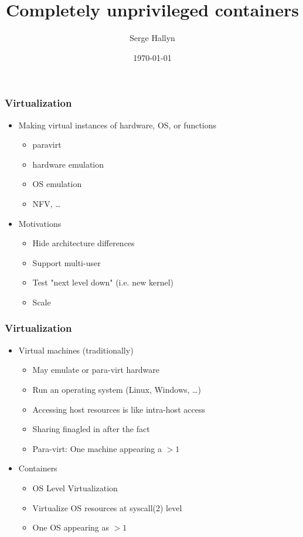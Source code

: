 \documentclass{beamer}
\title[Unprivileged containers]{Completely unprivileged containers} %
\author{Serge Hallyn} %
\institute{LXC project}
\date{\today} %
\begin{document}
\begin{frame}
\titlepage %
\end{frame}

\begin{frame}[fragile]
\frametitle{Virtualization}
	\begin{itemize}
	\item Making virtual instances of hardware, OS, or functions
		\begin{itemize}
		\item paravirt
		\item hardware emulation
		\item OS emulation
		\item NFV, \ldots
		\end{itemize}
\pause
	\item Motivations
		\begin{itemize}
		\item Hide architecture differences
		\item Support multi-user
		\item Test "next level down" (i.e. new kernel)
		\item Scale
		\end{itemize}
	\end{itemize}
\end{frame}

\begin{frame}[fragile]
\frametitle{Virtualization}
	\begin{itemize}
	\item Virtual machines (traditionally)
		\begin{itemize}
		\item May emulate or para-virt hardware
		\item Run an operating system (Linux, Windows, \ldots)
		\item Accessing host resources is like intra-host access
		\item Sharing finagled in after the fact
		\item Para-virt: One machine appearing a $> 1$
		\end{itemize}
\pause
	\item Containers
		\begin{itemize}
		\item OS Level Virtualization
		\item Virtualize OS resources at syscall(2) level
		\item One OS appearing as $> 1$
		\end{itemize}
	\end{itemize}
\end{frame}
\end{document}
